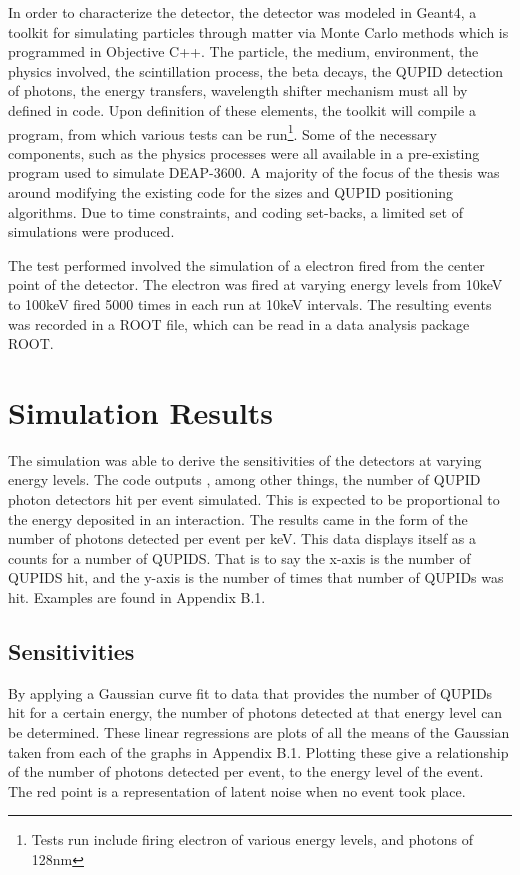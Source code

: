 \documentclass[11pt,a4paper,oneside]{report}
\begin{document}
In order to characterize the detector, the detector was modeled in Geant4, a toolkit for simulating particles through matter via Monte Carlo methods which is programmed in Objective C++. The particle, the medium, environment, the physics involved, the scintillation process, the beta decays, the QUPID detection of photons, the energy transfers, wavelength shifter mechanism must all by defined in code. Upon definition of these elements, the toolkit will compile a program, from which various tests can be run\footnote{Tests run include firing electron of various energy levels, and photons of 128nm}. Some of the necessary components, such as the physics processes were all available in a pre-existing program used to simulate DEAP-3600. A majority of the focus of the thesis was around modifying the existing code for the sizes and QUPID positioning algorithms. Due to time constraints, and coding set-backs, a limited set of simulations were produced.

The test performed involved the simulation of a electron fired from the center point of the detector. The electron was fired at varying energy levels from 10keV to 100keV fired 5000 times in each run at 10keV intervals. The resulting events was recorded in a ROOT file, which can be read in a data analysis package ROOT. 

\section{Simulation Results}

The simulation was able to derive the sensitivities of the detectors at varying energy levels. The code outputs , among other things, the number of QUPID photon detectors hit per event simulated. This is expected to be proportional to the energy deposited in an interaction. The results came in the form of the number of photons detected per event per keV. This data displays itself as a counts for a number of QUPIDS. That is to say the x-axis is the number of QUPIDS hit, and the y-axis is the number of times that number of QUPIDs was hit. Examples are found in Appendix B.1.

\subsection{Sensitivities}
By applying a Gaussian curve fit to data that provides the number of QUPIDs hit for a certain energy, the number of photons detected at that energy level can be determined. These linear regressions are plots of all the means of the Gaussian taken from each of the graphs in Appendix B.1. Plotting these give a relationship of the number of photons detected per event, to the energy level of the event. The red point is a representation of latent noise when no event took place.  
\end{document}
